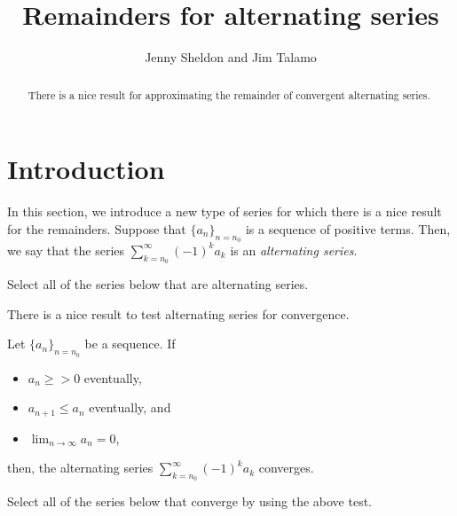 \documentclass{ximera}
\title[Dig-In:]{Remainders for alternating series}
\author{Jenny Sheldon and Jim Talamo}
\begin{document}
\begin{abstract}
There is a nice result for approximating the remainder of convergent alternating series. 
\end{abstract}
\maketitle

\section{Introduction}
In this section, we introduce a new type of series for which there is a nice result for the remainders.  Suppose that $\{a_n\}_{n=n_0}$ is a sequence of positive terms.  Then, we say that the series $\sum_{k=n_0}^{\infty} (-1)^k a_k$ is an \emph{alternating series}.

\begin{question}
Select all of the series below that are alternating series.

\begin{selectAll}
\end{selectAll}
\end{question}

There is a nice result to test alternating series for convergence.

\begin{theorem}
Let $\{a_n\}_{n=n_0}$ be a sequence.  If

\begin{itemize}
\item $a_n \geq > 0$ eventually,
\item $a_{n+1} \leq a_n$ eventually, and
\item $\lim_{n \to \infty} a_n=0$, 
\end{itemize}

then, the alternating series $\sum_{k=n_0}^\infty (-1)^{k}a_k$ converges.
\end{theorem}

\begin{question}
Select all of the series below that converge by using the above test.

\begin{selectAll}
\end{selectAll}
\end{question}
\end{document}
